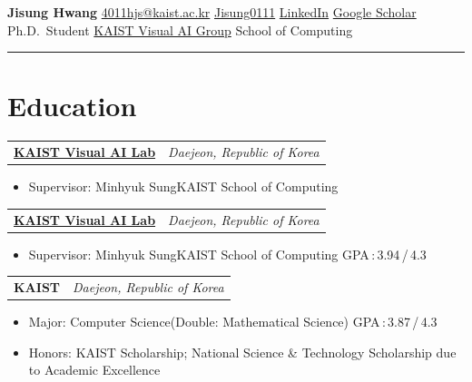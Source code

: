\documentclass[10pt, a4paper]{article}
\makeatletter
\newlength{\datecol}
\newlength{\entrygap}
\newlength{\detailgap}
\newcommand{\datefmt}[1]{{\small\color{muted}#1}}
\newcommand{\locfmt}[1]{{\small\itshape\color{location}#1}}
\newcommand{\visuailab}{\href{https://visualai.kaist.ac.kr/}{KAIST Visual AI Lab}}
\newcommand{\visualaigroup}{\href{https://visualai.kaist.ac.kr/}{KAIST Visual AI Group}}
\newcommand{\minorinfo}[1]{{\footnotesize\color{muted}#1}}
\newcommand{\briefinfo}[1]{{\small\bfseries\itshape\color{muted}#1}}
\newcommand{\cvheader}[4]{%
  \noindent
  \begin{tabularx}{\textwidth}{@{}Xr@{}}
    \makebox[\datecol][l]{\datefmt{#1}}%
    \textbf{#2}\ifblank{#3}{}{\enspace\briefinfo{#3}} &
    \locfmt{#4}
  \end{tabularx}%
}
\newenvironment{edulist}{%
  \begin{itemize}[
    leftmargin = \datecol,
    labelwidth=0pt, labelsep=0pt, itemindent=0pt,
    itemsep=0pt, parsep=0pt, topsep=\detailgap, partopsep=0pt,
    label={}
  ]
  \small\color{muted}
}{\end{itemize}\vspace{\entrygap}}
\makeatother
\begin{document}

\noindent
{\fontsize{26}{26}\selectfont\bfseries Jisung Hwang}%
\hfill
{\small\color{muted}
  \faEnvelope\enspace\href{mailto:4011hjs@kaist.ac.kr}{4011hjs@kaist.ac.kr}
  \quad
  \faGithub\enspace\href{https://github.com/Jisung0111}{Jisung0111}
  \quad
  \faLinkedin\enspace\href{https://www.linkedin.com/in/jisung-hwang-1a9365340}{LinkedIn}
  \quad
  \faGraduationCap\enspace
  \href{https://scholar.google.com/citations?user=0JtvonsAAAAJ&hl=ja}{Google Scholar}
}\\[6pt]
{\small\color{muted}
  Ph.D.\ Student\enspace\textbullet\enspace
  \visualaigroup\enspace\textbullet\enspace
  School of Computing%
}\\[-5pt]
{\color{accent}\hrule height 1.5pt}
\vspace{5pt}

\section{Education}

\cvheader
  {Mar.~2026\,$\sim$\,Present}
  {\visuailab}{Candidate for Ph.D.}
  {Daejeon, Republic of Korea}
\begin{edulist}
  \item Supervisor: Minhyuk Sung\enspace\textbullet\enspace KAIST School of Computing
\end{edulist}

\cvheader
  {Mar.~2024\,$\sim$\,Feb.~2026}
  {\visuailab}{M.S.}
  {Daejeon, Republic of Korea}
\begin{edulist}
  \item Supervisor: Minhyuk Sung\enspace\textbullet\enspace KAIST School of Computing
        \hfill \minorinfo{GPA\,:\,3.94\,/\,4.3}
\end{edulist}

\cvheader
  {Feb.~2020\,$\sim$\,Feb.~2024}
  {KAIST}{B.S.}
  {Daejeon, Republic of Korea}
\begin{edulist}
  \item Major: Computer Science\quad(Double: Mathematical Science)
        \hfill \minorinfo{GPA\,:\,3.87\,/\,4.3}
  \item \minorinfo{Honors: KAIST Scholarship;\enspace
        National Science \& Technology Scholarship due to Academic Excellence}
\end{edulist}
\end{document}
